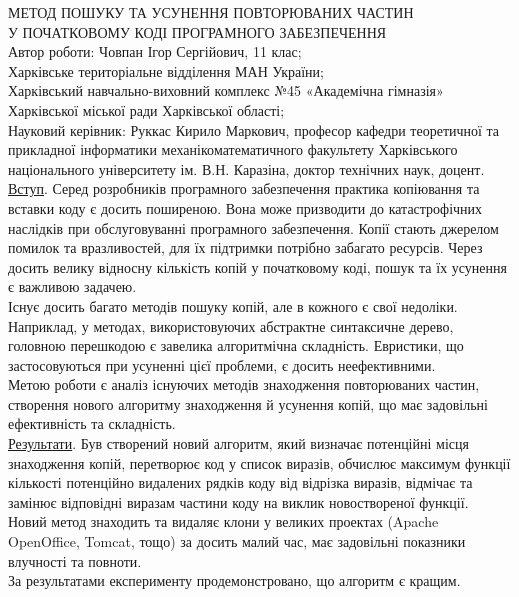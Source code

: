 \documentclass[a4paper, 14pt]{article}
\begin{document}
\pagebreak
\noindent
МЕТОД ПОШУКУ ТА УСУНЕННЯ ПОВТОРЮВАНИХ ЧАСТИН \\ 
У ПОЧАТКОВОМУ КОДІ ПРОГРАМНОГО ЗАБЕЗПЕЧЕННЯ \\
Автор роботи: Човпан Ігор Сергійович, 11 клас; \\
Харківське територіальне відділення МАН України; \\
Харківський навчально-виховний комплекс №45 «Академічна гімназія»
Харківської міської ради Харківської області; \\
Науковий керівник: Руккас Кирило Маркович, професор кафедри теоретичної та прикладної інформатики механіко­математичного факультету Харківського національного університету ім. В.Н. Каразіна, доктор технічних наук, доцент. \\
\newline \newline
\uline{Вступ}. Серед розробників програмного забезпечення практика копіювання та вставки коду є досить поширеною. Вона може призводити до катастрофічних наслідків при обслуговуванні програмного забезпечення. Копії стають джерелом помилок та вразливостей, для їх підтримки потрібно забагато ресурсів.
Через досить велику відносну кількість копій у початковому коді, пошук та їх усунення є важливою задачею. \\
Існує досить багато методів пошуку копій, але в кожного є свої недоліки. Наприклад, у методах, використовуючих абстрактне синтаксичне дерево, головною перешкодою є завелика алгоритмічна складність. Евристики, що застосовуються при усуненні цієї проблеми, є досить неефективними. \\
Метою роботи є аналіз існуючих методів знаходження повторюваних частин, створення нового алгоритму знаходження й усунення копій, що має задовільні ефективність та складність. \\
\uline{Результати}. Був створений новий алгоритм, який визначає потенційні місця знаходження копій, перетворює код у список виразів, обчислює максимум функції кількості потенційно видалених рядків коду від відрізка виразів, відмічає та замінює відповідні виразам частини коду на виклик новоствореної функції. \\
Новий метод знаходить та видаляє клони у великих проектах (Apache OpenOffice, Tomcat, тощо) за досить малий час, має задовільні показники влучності та повноти. \\
За результатами експерименту продемонстровано, що алгоритм є кращим. \\
\newpage
\tableofcontents %
\newpage
\end{document}
